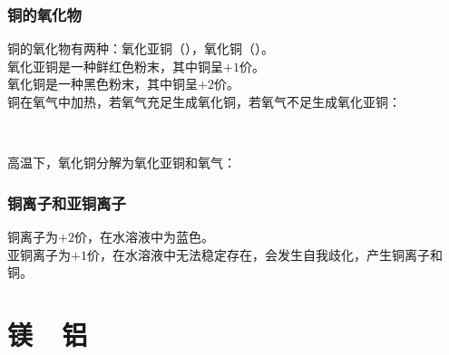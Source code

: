 \documentclass[UTF8]{ctexart}
\begin{document}
\subsubsection{铜的氧化物}
    铜的氧化物有两种：氧化亚铜（），氧化铜（）。\\[4mm]
    氧化亚铜是一种鲜红色粉末，其中铜呈$+1$价。\\[2mm]
    氧化铜是一种黑色粉末，其中铜呈$+2$价。\\[4mm]
    铜在氧气中加热，若氧气充足生成氧化铜，若氧气不足生成氧化亚铜：
    \begin{center}
        \\[3mm]
    \end{center}
    高温下，氧化铜分解为氧化亚铜和氧气：
    \begin{center}
    \end{center}

\subsubsection{铜离子和亚铜离子}
    铜离子为$+2$价，在水溶液中为蓝色。\\[3mm]
    亚铜离子为$+1$价，在水溶液中无法稳定存在，会发生自我歧化，产生铜离子和铜。

\newpage

\section{镁~~铝}
\end{document}

